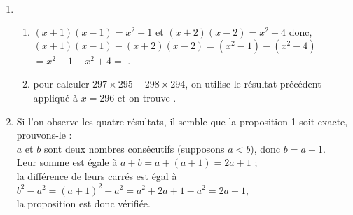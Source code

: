 \ \\ [-5mm]
\begin{enumerate}
   \item
   \begin{enumerate}
      \item $(x+1)(x-1) =x^2-1$ et $(x+2)(x-2) =x^2-4$ donc, \\
      $(x+1)(x-1)-(x+2)(x-2) =(x^2-1)-(x^2-4)$ \\
      \hspace*{4.35cm} $=x^2-1-x^2+4 =$ .
      \item pour calculer $297\times295-298\times294$, on utilise le résultat précédent appliqué à $x =296$ et on trouve .
      \end{enumerate}
      \item Si l'on observe les quatre résultats, il semble que la proposition 1 soit exacte, prouvons-le : \\
   $a$ et $b$ sont deux nombres consécutifs (supposons $a<b$), donc $b =a+1$. \\
   Leur somme est égale à $a+b =a+(a+1) =2a+1$ ; \\
   la différence de leurs carrés est égal à $b^2-a^2 =(a+1)^2-a^2 =a^2+2a+1-a^2 =2a+1$, \\
   la proposition est donc vérifiée. \\
\end{enumerate}
